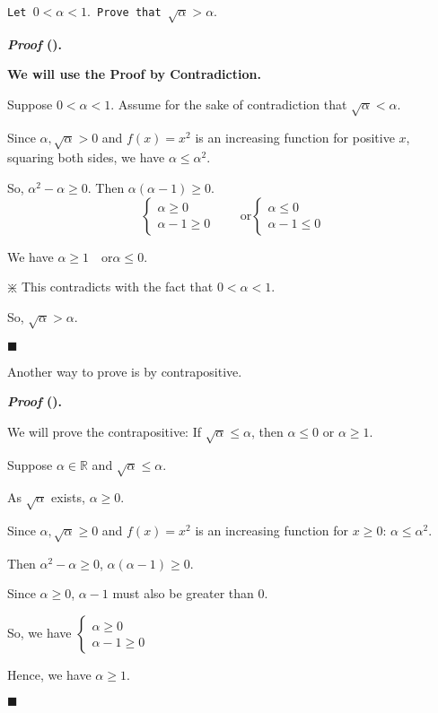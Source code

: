 \documentclass[12pt,a4paper]{article}
\newcounter{nprf}[subsection]
\newenvironment*{prf}{\par\indent\textbf{\textit{Proof} (\stepcounter{nprf}\thenprf). }\par }{\par\hfill $\blacksquare$\par}
\def\R{{\mathbb{R}}}
\begin{document}
\begin{framed}
\noindent\texttt{Let $0<\alpha<1.$ Prove that $\sqrt{\alpha}>\alpha.$}
\begin{prf}
	\textbf{We will use the Proof by Contradiction.}\par 
	Suppose $0<\alpha<1.$ Assume for the sake of contradiction that $\sqrt{\alpha}<\alpha.$\par Since $\alpha,\sqrt{\alpha}>0$ and $f(x)=x^2$ is an increasing function for positive $x$, squaring both sides, we have $\alpha\leq\alpha^2.$\par So, $\alpha^2-\alpha\geq0$. Then $\alpha(\alpha-1)\geq0.$\[\begin{cases}\alpha\geq0\\\alpha-1\geq0\end{cases}\qquad\text{or}\begin{cases}\alpha\leq0\\\alpha-1\leq0\end{cases}\]\par We have $\alpha\geq1\quad\text{or}\alpha\leq0$.\par\begin{center}$\divideontimes$ This contradicts with the fact that $0<\alpha<1.$\end{center}\par So, $\sqrt{\alpha}>\alpha.$
\end{prf}	
Another way to prove is by contrapositive.
\begin{prf}
	We will prove the contrapositive: If $\sqrt{\alpha}\leq\alpha$, then $\alpha\leq0$ or $\alpha\geq1.$\par Suppose $\alpha\in\R$ and $\sqrt{\alpha}\leq\alpha$.\par As $\sqrt{\alpha}$ exists, $\alpha\geq0.$\par Since $\alpha,\sqrt{\alpha}\geq0$ and $f(x)=x^2$ is an increasing function for $x\geq0$: $\alpha\leq\alpha^2.$ \par Then $\alpha^2-\alpha\geq0$, $\alpha(\alpha-1)\geq0$.\par Since $\alpha\geq0$, $\alpha-1$ must also be greater than $0$.\par So, we have $\begin{cases}\alpha\geq0\\\alpha-1\geq0\end{cases}$\par Hence, we have $\alpha\geq1.$
\end{prf}
\end{framed}
\end{document}
